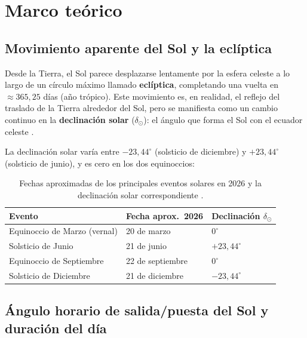 \section{Marco teórico}

\subsection{Movimiento aparente del Sol y la eclíptica}

Desde la Tierra, el Sol parece desplazarse lentamente por la esfera celeste a lo largo
de un círculo máximo llamado \textbf{eclíptica}, completando una vuelta en
${\approx}365{,}25$ días (año trópico).
Este movimiento es, en realidad, el reflejo del traslado de la Tierra alrededor del Sol,
pero se manifiesta como un cambio continuo en la \textbf{declinación solar}
($\delta_\odot$): el ángulo que forma el Sol con el ecuador celeste
\citep{CarrollOstlie2017}.

La declinación solar varía entre $-23{,}44^\circ$ (solsticio de diciembre) y
$+23{,}44^\circ$ (solsticio de junio), y es cero en los dos equinoccios:

\begin{table}[H]
  \centering
  \caption{Fechas aproximadas de los principales eventos solares en 2026 y la
           declinación solar correspondiente
           \citep{CarrollOstlie2017, Meeus1998}.}
  \label{tab:eventos}
  \begin{tabular}{lll}
    \toprule
    \textbf{Evento} & \textbf{Fecha aprox.\ 2026} & \textbf{Declinación $\delta_\odot$} \\
    \midrule
    Equinoccio de Marzo (vernal)  & 20 de marzo      & $0^\circ$       \\
    Solsticio de Junio            & 21 de junio      & $+23{,}44^\circ$ \\
    Equinoccio de Septiembre      & 22 de septiembre & $0^\circ$       \\
    Solsticio de Diciembre        & 21 de diciembre  & $-23{,}44^\circ$ \\
    \bottomrule
  \end{tabular}
\end{table}

\subsection{Ángulo horario de salida/puesta del Sol y duración del día}

